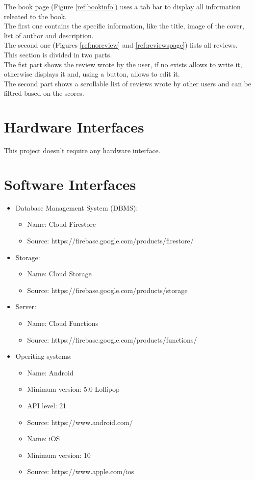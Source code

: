 The book page (Figure \ref{ref:bookinfo}) uses a tab bar to display all information releated to the book.\\ 
The first one contains the specific information, like the title, image of the cover, list of author and description.\\ 
The second one (Figures \ref{ref:noreview} and \ref{ref:reviewspage}) lists all reviews. This section is divided in two parts.\\
The fist part shows the review wrote by the user, if no exists allows to write it, otherwise displays it and, using a button, allows to edit it.\\
The second part shows a scrollable list of reviews wrote by other users and can be filtred based on the scores.
\clearpage
\section{Hardware Interfaces}
This project doesn’t require any hardware interface.
\section{Software Interfaces}
\begin{itemize}
    \item Database Management System (DBMS):
    \begin{itemize}
        \item 
        Name: Cloud Firestore
        \item 
        Source: https://firebase.google.com/products/firestore/
    \end{itemize}
    \item Storage:
    \begin{itemize}
        \item 
        Name: Cloud Storage
        \item 
        Source: https://firebase.google.com/products/storage
    \end{itemize}
    \item Server:
    \begin{itemize}
        \item 
        Name: Cloud Functions
        \item 
        Source: https://firebase.google.com/products/functions/
    \end{itemize}
    \item
    Operiting systems:
    \begin{itemize}
        \item 
        Name: Android
        \item 
        Minimum version: 5.0 Lollipop 
        \item 
        API level: 21
        \item 
        Source: https://www.android.com/\\ 
        \item 
        Name: iOS
        \item 
        Minimum version: 10
        \item 
        Source: https://www.apple.com/ios
    \end{itemize}
\end{itemize}
